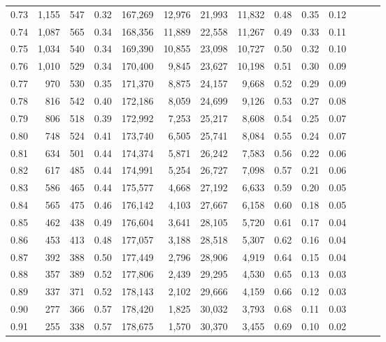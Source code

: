 \begin{tabular}{rrrrrrrrrrrrrr}
0.73 &  1,155 &    547 &  0.32 &  167,269 &   12,976 &  21,993 &  11,832 &  0.48 &  0.35 &      0.12 \\
0.74 &  1,087 &    565 &  0.34 &  168,356 &   11,889 &  22,558 &  11,267 &  0.49 &  0.33 &      0.11 \\
0.75 &  1,034 &    540 &  0.34 &  169,390 &   10,855 &  23,098 &  10,727 &  0.50 &  0.32 &      0.10 \\
0.76 &  1,010 &    529 &  0.34 &  170,400 &    9,845 &  23,627 &  10,198 &  0.51 &  0.30 &      0.09 \\
0.77 &    970 &    530 &  0.35 &  171,370 &    8,875 &  24,157 &   9,668 &  0.52 &  0.29 &      0.09 \\
0.78 &    816 &    542 &  0.40 &  172,186 &    8,059 &  24,699 &   9,126 &  0.53 &  0.27 &      0.08 \\
0.79 &    806 &    518 &  0.39 &  172,992 &    7,253 &  25,217 &   8,608 &  0.54 &  0.25 &      0.07 \\
0.80 &    748 &    524 &  0.41 &  173,740 &    6,505 &  25,741 &   8,084 &  0.55 &  0.24 &      0.07 \\
0.81 &    634 &    501 &  0.44 &  174,374 &    5,871 &  26,242 &   7,583 &  0.56 &  0.22 &      0.06 \\
0.82 &    617 &    485 &  0.44 &  174,991 &    5,254 &  26,727 &   7,098 &  0.57 &  0.21 &      0.06 \\
0.83 &    586 &    465 &  0.44 &  175,577 &    4,668 &  27,192 &   6,633 &  0.59 &  0.20 &      0.05 \\
0.84 &    565 &    475 &  0.46 &  176,142 &    4,103 &  27,667 &   6,158 &  0.60 &  0.18 &      0.05 \\
0.85 &    462 &    438 &  0.49 &  176,604 &    3,641 &  28,105 &   5,720 &  0.61 &  0.17 &      0.04 \\
0.86 &    453 &    413 &  0.48 &  177,057 &    3,188 &  28,518 &   5,307 &  0.62 &  0.16 &      0.04 \\
0.87 &    392 &    388 &  0.50 &  177,449 &    2,796 &  28,906 &   4,919 &  0.64 &  0.15 &      0.04 \\
0.88 &    357 &    389 &  0.52 &  177,806 &    2,439 &  29,295 &   4,530 &  0.65 &  0.13 &      0.03 \\
0.89 &    337 &    371 &  0.52 &  178,143 &    2,102 &  29,666 &   4,159 &  0.66 &  0.12 &      0.03 \\
0.90 &    277 &    366 &  0.57 &  178,420 &    1,825 &  30,032 &   3,793 &  0.68 &  0.11 &      0.03 \\
0.91 &    255 &    338 &  0.57 &  178,675 &    1,570 &  30,370 &   3,455 &  0.69 &  0.10 &      0.02 \\

\end{tabular}
